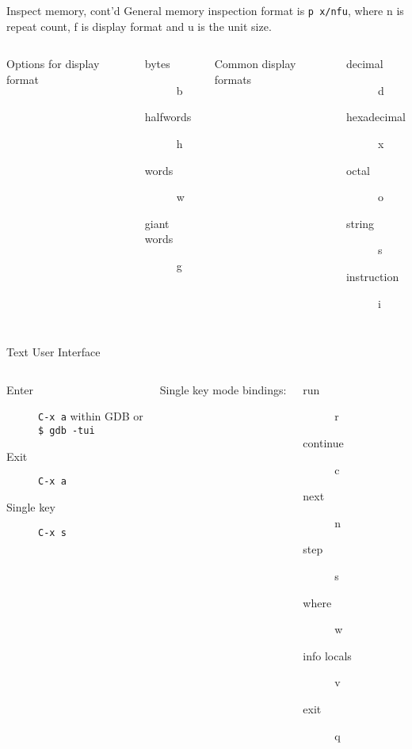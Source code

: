 \documentclass{beamer}
\begin{document}
  \begin{frame}{Inspect memory, cont'd}
    General memory inspection format is \texttt{p x/nfu}, where n is
    repeat count, f is display format and u is the unit size.
    \vfill

    \begin{columns}
      Options for display format
      \begin{description}
        \item[bytes] b
        \item[halfwords] h
        \item[words] w
        \item[giant words] g
      \end{description}

      Common display formats
      \begin{description}
        \item[decimal] d
        \item[hexadecimal] x
        \item[octal] o
        \item[string] s
        \item[instruction] i
      \end{description}
    \end{columns}

  \end{frame}

  \begin{frame}{Text User Interface}
    \begin{columns}
        \begin{description} 
          \item[Enter] \texttt{C-x a} within GDB or \\ \texttt{\$ gdb -tui}
          \item[Exit] \texttt{C-x a} 
          \item[Single key] \texttt{C-x s}
        \end{description}
    
        Single key mode bindings:
        \begin{description}
          \item[run] r
          \item[continue] c
          \item[next] n
          \item[step] s
          \item[where] w
          \item[info locals] v
          \item[exit] q
        \end{description}
    \end{columns}
  \end{frame}
\end{document}
